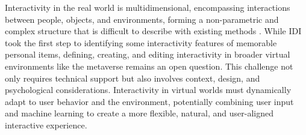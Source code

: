 Interactivity in the real world is multidimensional, encompassing interactions between people, objects, and environments, forming a non-parametric and complex structure that is difficult to describe with existing methods \cite{gibson1977theory,10.1145/3446370}. While IDI took the first step to identifying some interactivity features of memorable personal items, defining, creating, and editing interactivity in broader virtual environments like the metaverse remains an open question. This challenge not only requires technical support but also involves context, design, and psychological considerations. Interactivity in virtual worlds must dynamically adapt to user behavior and the environment, potentially combining user input and machine learning to create a more flexible, natural, and user-aligned interactive experience.











